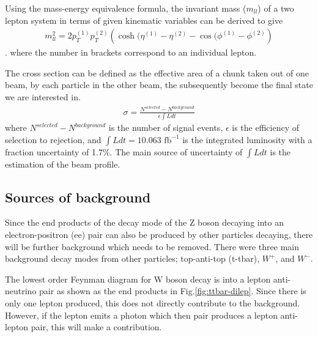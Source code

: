 \documentclass[%
 reprint,
 amsmath,amssymb,
 aps,
]{revtex4-2}
\begin{document}
Using the mass-energy equivalence formula, the invariant mass ($m_{ll}$) of a two lepton system in terms of given kinematic variables can be derived to give 
\begin{align}
    m_{ll}^2 = 2 p_T^{(1)} p_T^{(2)} \left( \cosh (\eta^{(1)} - \eta^{(2)} - \cos (\phi^{(1)} - \phi^{(2)} \right)
    \label{eq:invar-mass-2lep}
\end{align}.
where the number in brackets correspond to an individual lepton.

The cross section can be defined as the effective area of a chunk taken out of one beam, by each particle in the other beam, the subsequently become the final state we are interested in\cite{QFT-Peskin}. %
\begin{align}
    \sigma = \frac{N^{selected} - N^{background}}{\epsilon \int L dt}
    \label{eq:cs}
\end{align}
where $N^{selected} - N^{background}$ is the number of signal events, $\epsilon$ is the efficiency of selection to rejection, and $\int L dt = 10.063 \text{ fb}^{-1}$ is the integrated luminosity with a fraction uncertainty of 1.7\%.  The main source of uncertainty of $\int L dt$ is the estimation of the beam profile\cite{Burkhardt-prof}.

\subsection{Sources of background}
Since the end products of the decay mode of the Z boson decaying into an electron-positron (ee) pair can also be produced by other particles decaying, there will be further background which needs to be removed. 
There were three main background decay modes from other particles; top-anti-top (t-tbar), $W^{+}$, and $W^{-}$.

The lowest order Feynman diagram for W boson decay is into a lepton anti-neutrino pair as shown as the end products in Fig.\ref{fig:ttbar-dilep}. \cite{PhysRevLett.79.3585}  Since there is only one lepton produced, this does not directly contribute to the background.  However, if the lepton emits a photon which then pair produces a lepton anti-lepton pair, this will make a contribution.
\end{document}
